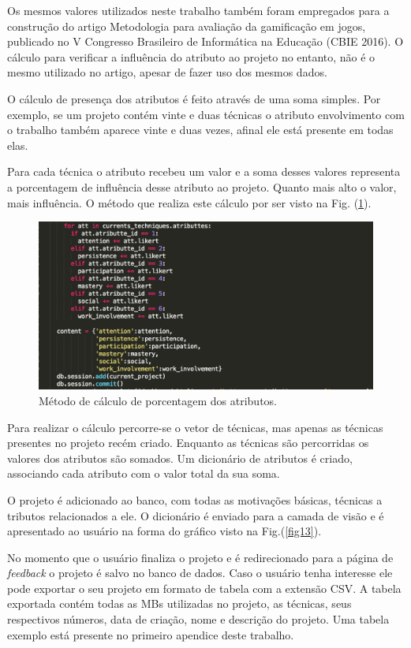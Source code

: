 \newpage
Os mesmos valores utilizados neste trabalho também foram empregados para a construção do artigo Metodologia para avaliação da gamificação em jogos, publicado no V Congresso Brasileiro de Informática na Educação (CBIE 2016). O cálculo para verificar a influência do atributo ao projeto no entanto, não é o mesmo utilizado no artigo, apesar de fazer uso dos mesmos dados.


O cálculo de presença dos atributos é feito através de uma soma simples. Por exemplo, se um projeto contém vinte e duas técnicas o atributo envolvimento com o trabalho também aparece vinte e duas vezes, afinal ele está presente em todas elas. 

Para cada técnica o atributo recebeu um valor e a soma desses valores representa a porcentagem de influência desse atributo ao projeto. Quanto mais alto o valor, mais influência. O método que realiza este cálculo por ser visto na Fig. (\ref{fig14}).


\begin{figure}[h]
	\centering
		\includegraphics[keepaspectratio=true,scale=0.6]{figuras/att.png}
	\caption{Método de cálculo de porcentagem dos atributos.\label{fig14}}
\end{figure}


Para realizar o cálculo percorre-se o vetor de técnicas, mas apenas as técnicas presentes no projeto recém criado. Enquanto as técnicas são percorridas os valores dos atributos são somados. Um dicionário de atributos é criado, associando cada atributo com o valor total da sua soma.

 O projeto é adicionado ao banco, com todas as motivações básicas, técnicas a tributos relacionados a ele. O dicionário é enviado para a camada de visão e é apresentado ao usuário na forma do gráfico visto na  Fig.(\ref{fig13}).


No momento que o usuário finaliza o projeto e é redirecionado para a página de \textit{feedback} o projeto é salvo no banco de dados. Caso o usuário tenha interesse ele pode exportar o seu projeto em formato de tabela com a extensão CSV. A tabela exportada contém todas as MBs utilizadas no projeto, as técnicas, seus respectivos números, data de criação, nome e descrição do projeto. Uma tabela exemplo está presente no primeiro apendice deste trabalho.

